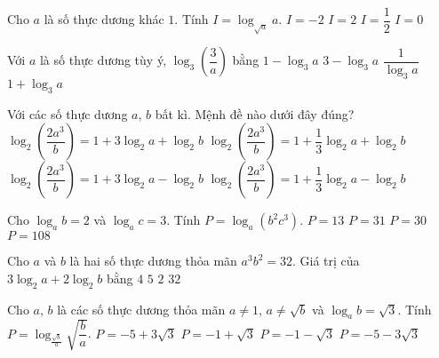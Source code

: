 \begin{ex}%
	[Mã 123 2017]
	Cho $a$ là số thực dương khác $1$. Tính $I=\log_{\sqrt{a}}a.$ 
	\choice
	{$ I=-2$}
	{\True $ I=2$}
	{$ I=\dfrac{1}{2}$}
	{$ I=0$}
\end{ex}
\begin{ex}%
	[Mã 104 2018]
	Với $a$ là số thực dương tùy ý, $\log_3\left(\dfrac{3}{a}\right)$ bằng
	\choice
	{\True $1-\log_3a$}
	{$3-\log_3a$}
	{$\dfrac{1}{\log_3a}$}
	{$1+\log_3a$}
\end{ex}
\begin{ex}%
	Với các số thực dương $a$, $b$ bất kì. Mệnh đề nào dưới đây đúng?
	\choice
	{\True $\log_2\left(\dfrac{2a^3}{b}\right)=1+3\log_2a+\log_2b$}
	{$\log_2\left(\dfrac{2a^3}{b}\right)=1+\dfrac{1}{3}{\log_2}a+\log_2b$}
	{$\log_2\left(\dfrac{2a^3}{b}\right)=1+3\log_2a-\log_2b$}
	{$\log_2\left(\dfrac{2a^3}{b}\right)=1+\dfrac{1}{3}{\log_2}a-\log_2b$}
\end{ex}
\begin{ex}%
	[Mã 110 2017]
	Cho $\log_ab=2$ và $\log_ac=3$. Tính $P=\log_a\left(b^2c^3\right)$.
	\choice
	{\True $P=13$}
	{$P=31$}
	{$P=30$}
	{$P=108$}
\end{ex}
\begin{ex}%
	[Mã 102 2019]
	Cho $a$ và $b$ là hai số thực dương thỏa mãn $a^3b^2=32$. Giá trị của $3\log_2a+2\log_2b$ bằng
	\choice
	{$4$}
	{\True $5$}
	{$2$}
	{$32$}
\end{ex}
\begin{ex}%
	[Đề Tham Khảo 2017]
	Cho $a$, $b$ là các số thực dương thỏa mãn $a\ne 1$, $a\ne\sqrt{b}$ và $\log_ab=\sqrt{3}$. Tính $P=\log_{\frac{\sqrt{b}}{a}}\sqrt{\dfrac{b}{a}}$.
	\choice
	{$P=-5+3\sqrt{3}$}
	{$P=-1+\sqrt{3}$}
	{\True $P=-1-\sqrt{3}$}
	{$P=-5-3\sqrt{3}$}
\end{ex}
